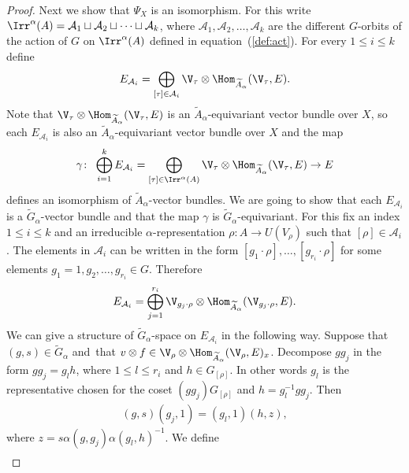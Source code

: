 \begin{proof}
Next we show that $\Psi_{X}$ is an isomorphism. For this write $\Irr^{\alpha}(A)=
\mathcal{A}_{1}\sqcup\mathcal{A}_{2}\sqcup\dots \sqcup\mathcal{A}_{k}$, where
$\mathcal{A}_{1},\mathcal{A}_{2},\dots, \mathcal{A}_{k}$ are the different
$G$-orbits of the action of $G$ on $\Irr^{\alpha}(A)$ defined in equation~(\ref{def:act}).
For every $1\leq i\leq k$ define
\begin{gather*}
E_{\mathcal{A}_{i}}=\bigoplus_{[\tau]\in \mathcal{A}_{i}}
\V_{\tau}\otimes \Hom_{\widetilde{A}_{\alpha}}(\V_{\tau},E).
\end{gather*}
Note that $\V_{\tau}\otimes \Hom_{\widetilde{A}_{\alpha}}(\V_{\tau},E)$ is an
$\widetilde{A}_{\alpha}$-equivariant vector bundle over $X$, so each
$E_{\mathcal{A}_{i}}$ is also an $\widetilde{A}_{\alpha}$-equivariant vector bundle over $X$
and the map
\begin{gather*}
\gamma\colon\ \bigoplus_{i=1}^{k}E_{\mathcal{A}_{i}}=\bigoplus_{[\tau]\in \Irr^{\alpha}(A)}
\V_{\tau}\otimes \Hom_{\widetilde{A}_{\alpha}}(\V_{\tau},E)\rightarrow E
\end{gather*}
defines an isomorphism of $\widetilde{A}_{\alpha}$-vector bundles. We are going to show that each
$E_{\mathcal{A}_{i}}$ is a $\widetilde{G}_{\alpha}$-vector bundle and that the map $\gamma$ is
$\widetilde{G}_{\alpha}$-equivariant. For this fix an index $1\leq i\leq k$ and an irreducible
$\alpha$-representation $\rho\colon A\rightarrow U(V_{\rho})$ such that
$[\rho]\in\mathcal{A}_{i}$. The elements in $\mathcal{A}_{i}$ can be written in the
form $[g_{1}\cdot\rho], \dots, [g_{r_{i}}\cdot\rho]$ for some elements
$g_{1}=1,g_{2},\dots,g_{r_{i}}\in G$. Therefore
\begin{gather*}
E_{\mathcal{A}_{i}}=\bigoplus_{j=1}^{r_{i}}\V_{g_{j}\cdot\rho}\otimes
\Hom_{\widetilde{A}_{\alpha}}(\V_{g_{j}\cdot\rho},E).
\end{gather*}
We can give a structure of
$\widetilde{G}_{\alpha}$-space on $E_{\mathcal{A}_{i}}$ in the following way.
Suppose that $(g,s)\in\widetilde{G}_{\alpha}$ and~that
$v\otimes f\in \V_{\rho}\otimes \Hom_{\widetilde{A}_{\alpha}}(\V_{\rho},E)_{x}$.
Decompose $gg_{j}$ in the form $gg_{j}=g_{l}h$, where $1\leq l\leq r_{i}$ and $h\in G_{[\rho]}$.
In other words $g_{l}$ is the representative chosen for the coset
$(gg_{j})G_{[\rho]}$ and $h=g_{l}^{-1}gg_{j}$. Then
\begin{gather*}
(g,s)(g_{j},1)=(g_{l},1)(h,z),
\end{gather*}
where $z=s\alpha(g,g_{j})\alpha(g_{l},h)^{-1}$. We define
\begin{gather*}

\end{gather*}
\end{proof}
